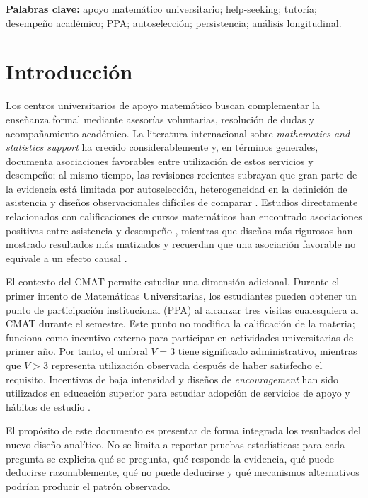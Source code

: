 \documentclass[11pt,letterpaper]{article}
\begin{document}
\noindent\textbf{Palabras clave:} apoyo matemático universitario; help-seeking; tutoría; desempeño académico; PPA; autoselección; persistencia; análisis longitudinal.

\tableofcontents
\listoffigures
\listoftables
\clearpage
{}

\section{Introducción}

Los centros universitarios de apoyo matemático buscan complementar la enseñanza formal mediante asesorías voluntarias, resolución de dudas y acompañamiento académico. La literatura internacional sobre \emph{mathematics and statistics support} ha crecido considerablemente y, en términos generales, documenta asociaciones favorables entre utilización de estos servicios y desempeño; al mismo tiempo, las revisiones recientes subrayan que gran parte de la evidencia está limitada por autoselección, heterogeneidad en la definición de asistencia y diseños observacionales difíciles de comparar \citep{mullen2024,lawson2020}. Estudios directamente relacionados con calificaciones de cursos matemáticos han encontrado asociaciones positivas entre asistencia y desempeño \citep{rickard2018,macanbhaird2009,jacob2019}, mientras que diseños más rigurosos han mostrado resultados más matizados y recuerdan que una asociación favorable no equivale a un efecto causal \citep{buchele2024}.

El contexto del CMAT permite estudiar una dimensión adicional. Durante el primer intento de Matemáticas Universitarias, los estudiantes pueden obtener un punto de participación institucional (PPA) al alcanzar tres visitas cualesquiera al CMAT durante el semestre. Este punto no modifica la calificación de la materia; funciona como incentivo externo para participar en actividades universitarias de primer año. Por tanto, el umbral $V=3$ tiene significado administrativo, mientras que $V>3$ representa utilización observada después de haber satisfecho el requisito. Incentivos de baja intensidad y diseños de \emph{encouragement} han sido utilizados en educación superior para estudiar adopción de servicios de apoyo y hábitos de estudio \citep{paloyo2016,pugatch2018}.

El propósito de este documento es presentar de forma integrada los resultados del nuevo diseño analítico. No se limita a reportar pruebas estadísticas: para cada pregunta se explicita qué se pregunta, qué responde la evidencia, qué puede deducirse razonablemente, qué no puede deducirse y qué mecanismos alternativos podrían producir el patrón observado.
\end{document}
